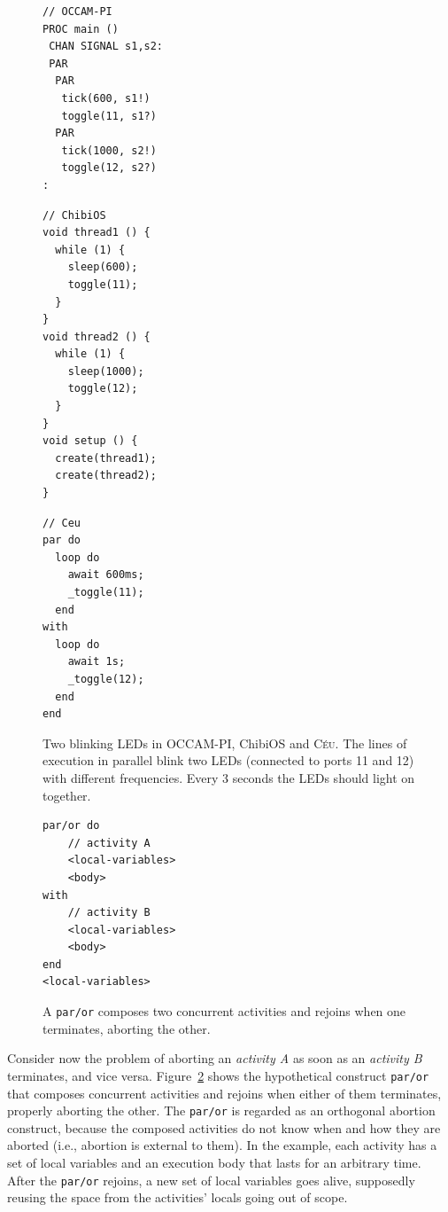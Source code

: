 \documentclass{acm_proc_article-sp}
\newcommand{\CEU}{\textsc{C\'{e}u}\xspace}
\newcommand{\code}[1] {{\small{\texttt{#1}}}}
\newcommand{\1}{\;}
\newcommand{\2}{\;\;}
\newcommand{\3}{\;\;\;}
\newcommand{\5}{\;\;\;\;\;}
\begin{document}
\begin{figure}[t]
\begin{minipage}[t]{0.34\linewidth}
\begin{lstlisting}
// OCCAM-PI
PROC main ()
 CHAN SIGNAL s1,s2:
 PAR
  PAR
   tick(600, s1!)
   toggle(11, s1?)
  PAR
   tick(1000, s2!)
   toggle(12, s2?)
:

\end{lstlisting}
\end{minipage}
%
\begin{minipage}[t]{0.33\linewidth}
\begin{lstlisting}
// ChibiOS
void thread1 () {
  while (1) {
    sleep(600);
    toggle(11);
  }
}
void thread2 () {
  while (1) {
    sleep(1000);
    toggle(12);
  }
}
void setup () {
  create(thread1);
  create(thread2);
}

\end{lstlisting}
\end{minipage}
%
\begin{minipage}[t]{0.31\linewidth}
\begin{lstlisting}
// Ceu
par do
  loop do
    await 600ms;
    _toggle(11);
  end
with
  loop do
    await 1s;
    _toggle(12);
  end
end
\end{lstlisting}
\end{minipage}
%
\caption{ Two blinking LEDs in OCCAM-PI, ChibiOS and \CEU.\newline
{\small %
The lines of execution in parallel blink two LEDs (connected to ports 11 and 
12) with different frequencies.
Every 3 seconds the LEDs should light on together.
}%
\label{lst.leds}
}
\end{figure}


\begin{figure}[t]
\begin{lstlisting}
par/or do
    // activity A
    <local-variables>
    <body>
with
    // activity B
    <local-variables>
    <body>
end
<local-variables>
\end{lstlisting}
\caption{ A \code{par/or} composes two concurrent activities and rejoins when 
one terminates, aborting the other.
\label{lst.abortion}
}
\end{figure}

Consider now the problem of aborting an \emph{activity A} as soon as an
\emph{activity B} terminates, and vice versa.
%
Figure~\ref{lst.abortion} shows the hypothetical construct \code{par/or} that 
composes concurrent activities and rejoins when either of them terminates, 
properly aborting the other.
%
The \code{par/or} is regarded as an orthogonal abortion construct, because the 
composed activities do not know when and how they are aborted (i.e., abortion 
is external to them).
%
In the example, each activity has a set of local variables and an execution 
body that lasts for an arbitrary time.
After the \code{par/or} rejoins, a new set of local variables goes alive, 
supposedly reusing the space from the activities' locals going out of scope.
\end{document}
